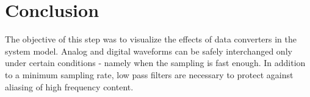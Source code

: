 \documentclass[]{article}
\begin{document}
%
%
%
%



\newpage
\section{Conclusion}
\label{sec:conc}

The objective of this step was to visualize the effects of data converters in the system model.  Analog and digital waveforms can be safely interchanged only under certain conditions - namely when the sampling is fast enough.  In addition to a minimum sampling rate, low pass filters are necessary to protect against aliasing of high frequency content.  \\
\end{document}
